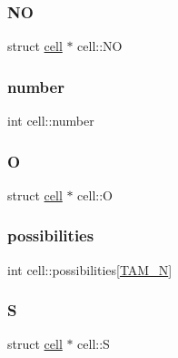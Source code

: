 \mbox{\label{structcell_a5cbdcdf78a6dbead8781c747eaa42737}} 
\subsubsection{\texorpdfstring{NO}{NO}}
{\footnotesize\ttfamily struct \mbox{\hyperlink{structcell}{cell}} $\ast$ cell\+::\+NO}

\mbox{\label{structcell_a1788c6d7f1749ef7e9e934f4554ff8eb}} 
\subsubsection{\texorpdfstring{number}{number}}
{\footnotesize\ttfamily int cell\+::number}

\mbox{\label{structcell_af562d688067bf164931360b554c371fb}} 
\subsubsection{\texorpdfstring{O}{O}}
{\footnotesize\ttfamily struct \mbox{\hyperlink{structcell}{cell}} $\ast$ cell\+::O}

\mbox{\label{structcell_ae1112866a58e5206062ff932b6fd81fd}} 
\subsubsection{\texorpdfstring{possibilities}{possibilities}}
{\footnotesize\ttfamily int cell\+::possibilities\mbox{[}\mbox{\hyperlink{fase2_8h_af0740ca2d3b392c4fa6c2bd62acbc75b}{T\+A\+M\+\_\+N}}\mbox{]}}

\mbox{\label{structcell_a808fa38c56c2edaa1d553d7ee194a1e6}} 
\subsubsection{\texorpdfstring{S}{S}}
{\footnotesize\ttfamily struct \mbox{\hyperlink{structcell}{cell}} $\ast$ cell\+::S}

